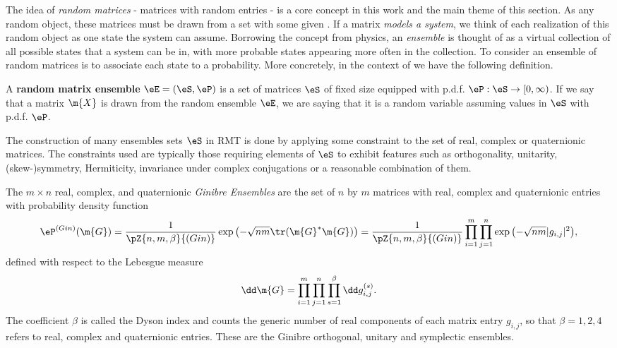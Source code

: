 The idea of \textit{random matrices} - matrices with random entries - is a core concept in this work and the main theme of this section. As any random object, these matrices must be drawn from a set with some given . If a matrix \textit{models a system}, we think of each realization of this random object as one state the system can assume.  Borrowing the concept from physics, an \textit{ensemble} is thought of as a virtual collection of all possible states that a system can be in, with more probable states appearing more often in the collection. To consider an ensemble of random matrices is to associate each state to a probability. More concretely, in the context of  we have the following definition.

\begin{definicao}
	\label{Definition: Matrix Ensemble}
	A \textbf{random matrix ensemble} $\eE = (\eS, \eP)$ is a set of matrices $\eS$ of fixed size equipped with p.d.f. $\eP: \eS \rightarrow [0, \infty)$. If we say that a matrix $\m{X}$ is drawn from the random ensemble $\eE$, we are saying that it is a random variable assuming values in $\eS$ with p.d.f. $\eP$.
\end{definicao}

The construction of many ensembles sets $\eS$ in RMT is done by applying some constraint to the set of real, complex or quaternionic matrices. The constraints used are typically those requiring elements of $\eS$ to exhibit features such as orthogonality, unitarity, (skew-)symmetry, Hermiticity, invariance under complex conjugations or a reasonable combination of them.

\begin{exemplo} \label{Example: Ginibre Ensemble}
	The $m \times n$ real, complex, and quaternionic \textit{Ginibre Ensembles} are the set of $n$ by $m$ matrices with real, complex and quaternionic entries with probability density function
	\begin{equation}
		\eP^{(Gin)}(\m{G}) = \frac{1}{\pZ{n,m, \beta}{(Gin)}} \exp{\left( - \sqrt{nm} \tr(\m{G}^{*}\m{G})\right)} = \frac{1}{\pZ{n,m,\beta}{(Gin)}} \prod_{i=1}^{m} \prod_{j=1}^{n} \exp{\left(- \sqrt{nm} |g_{i,j}|^2 \right)},
	\end{equation}
	defined with respect to the Lebesgue measure
	\begin{equation}
		\dd \m{G} = \prod_{i=1}^{m} \prod_{j=1}^{n} \prod_{s=1}^\beta \dd g_{i,j}^{(s)}.
	\end{equation}
	The coefficient $\beta$ is called the Dyson index and counts the generic number of real components of each matrix entry $g_{i,j}$, so that $\beta=1,2,4$ refers to real, complex and quaternionic entries. These are the Ginibre orthogonal, unitary and symplectic ensembles.
\end{exemplo}
 
